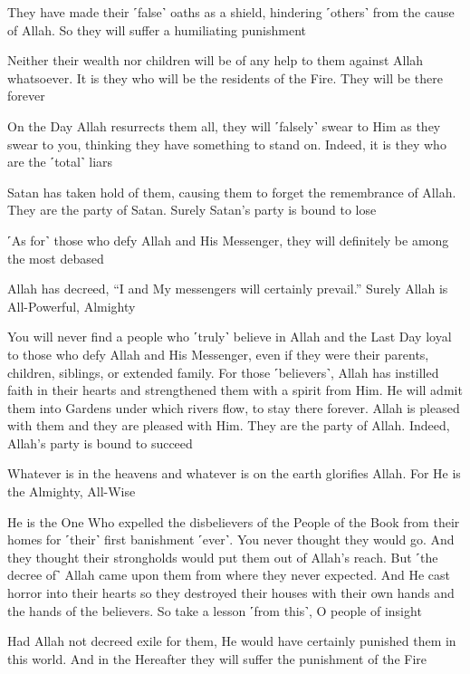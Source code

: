 They have made their ˹false˺ oaths as a shield, hindering ˹others˺ from the cause of Allah. So they will suffer a humiliating punishment

Neither their wealth nor children will be of any help to them against Allah whatsoever. It is they who will be the residents of the Fire. They will be there forever

On the Day Allah resurrects them all, they will ˹falsely˺ swear to Him as they swear to you, thinking they have something to stand on. Indeed, it is they who are the ˹total˺ liars

Satan has taken hold of them, causing them to forget the remembrance of Allah. They are the party of Satan. Surely Satan’s party is bound to lose

˹As for˺ those who defy Allah and His Messenger, they will definitely be among the most debased

Allah has decreed, “I and My messengers will certainly prevail.” Surely Allah is All-Powerful, Almighty

You will never find a people who ˹truly˺ believe in Allah and the Last Day loyal to those who defy Allah and His Messenger, even if they were their parents, children, siblings, or extended family. For those ˹believers˺, Allah has instilled faith in their hearts and strengthened them with a spirit from Him. He will admit them into Gardens under which rivers flow, to stay there forever. Allah is pleased with them and they are pleased with Him. They are the party of Allah. Indeed, Allah’s party is bound to succeed

Whatever is in the heavens and whatever is on the earth glorifies Allah. For He is the Almighty, All-Wise

He is the One Who expelled the disbelievers of the People of the Book from their homes for ˹their˺ first banishment ˹ever˺. You never thought they would go. And they thought their strongholds would put them out of Allah’s reach. But ˹the decree of˺ Allah came upon them from where they never expected. And He cast horror into their hearts so they destroyed their houses with their own hands and the hands of the believers. So take a lesson ˹from this˺, O people of insight

Had Allah not decreed exile for them, He would have certainly punished them in this world. And in the Hereafter they will suffer the punishment of the Fire

